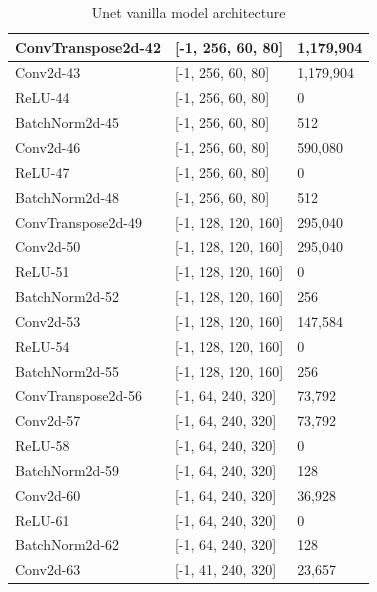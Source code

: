     \begin{table}[]
    	\begin{center}
    		\begin{tabular}{| l | l | p{3cm} |}
    			\hline
    			ConvTranspose2d-42 & {[}-1, 256, 60, 80{]}   & 1,179,904 \\ \hline
				Conv2d-43          & {[}-1, 256, 60, 80{]}   & 1,179,904 \\ \hline
				ReLU-44            & {[}-1, 256, 60, 80{]}   & 0         \\ \hline
				BatchNorm2d-45     & {[}-1, 256, 60, 80{]}   & 512       \\ \hline
				Conv2d-46          & {[}-1, 256, 60, 80{]}   & 590,080   \\ \hline
				ReLU-47            & {[}-1, 256, 60, 80{]}   & 0         \\ \hline
				BatchNorm2d-48     & {[}-1, 256, 60, 80{]}   & 512       \\ \hline
				ConvTranspose2d-49 & {[}-1, 128, 120, 160{]} & 295,040   \\ \hline
				Conv2d-50          & {[}-1, 128, 120, 160{]} & 295,040   \\ \hline
    			ReLU-51            & {[}-1, 128, 120, 160{]} & 0         \\ \hline
    			BatchNorm2d-52     & {[}-1, 128, 120, 160{]} & 256       \\ \hline
    			Conv2d-53          & {[}-1, 128, 120, 160{]} & 147,584   \\ \hline
    			ReLU-54            & {[}-1, 128, 120, 160{]} & 0         \\ \hline
    			BatchNorm2d-55     & {[}-1, 128, 120, 160{]} & 256       \\ \hline
    			ConvTranspose2d-56 & {[}-1, 64, 240, 320{]}  & 73,792    \\ \hline
    			Conv2d-57          & {[}-1, 64, 240, 320{]}  & 73,792    \\ \hline
    			ReLU-58            & {[}-1, 64, 240, 320{]}  & 0         \\ \hline
    			BatchNorm2d-59     & {[}-1, 64, 240, 320{]}  & 128       \\ \hline
    			Conv2d-60          & {[}-1, 64, 240, 320{]}  & 36,928    \\ \hline
    			ReLU-61            & {[}-1, 64, 240, 320{]}  & 0         \\ \hline
    			BatchNorm2d-62     & {[}-1, 64, 240, 320{]}  & 128       \\ \hline
    			Conv2d-63          & {[}-1, 41, 240, 320{]}  & 23,657    \\ \hline
    		\end{tabular}
    		\caption{Unet vanilla model architecture}
    		\label{table:unet_vanilla_model_2}
    	\end{center}
    \end{table}

